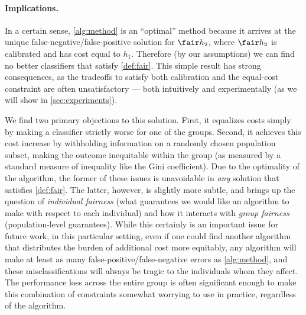 
\paragraph{Implications.}
In a certain sense, \autoref{alg:method} is an ``optimal'' method
because it arrives at the unique false-negative/false-positive solution for $\fair h_2$,
where $\fair h_2$ is calibrated and has cost equal to $h_1$. Therefore
(by our assumptions) we can find no better classifiers that satisfy \autoref{def:fair}.
%
This simple result has strong consequences, as the tradeoffs to
satisfy both calibration and the equal-cost constraint are often unsatisfactory
--- both intuitively and experimentally (as we will show in \autoref{sec:experiments}).

We find two primary objections to this solution. First, it equalizes
costs simply by making a classifier strictly worse for one of the groups.
Second, it achieves this
cost increase by withholding information on a randomly chosen population subset,
making the outcome inequitable within the group (as measured by a standard measure
of inequality like the Gini coefficient). Due to the optimality of the
algorithm, the former of these issues is unavoidable in \emph{any} solution that
satisfies \autoref{def:fair}. The latter, however, is slightly more subtle, and
brings up the question of \emph{individual fairness} (what guarantees we would
like an algorithm to make with respect to each individual) and how it interacts
with \emph{group fairness} (population-level guarantees). While this certainly
is an important issue for future work, in this particular setting, even if one
could find another algorithm that distributes the burden of additional cost more
equitably, any algorithm will make at least as many false-positive/false-negative
errors as \autoref{alg:method}, and these misclassifications will always be
tragic to the individuals whom they affect.
The performance loss across the entire group is often
significant enough to make this combination of constraints somewhat worrying to
use in practice, regardless of the algorithm.

